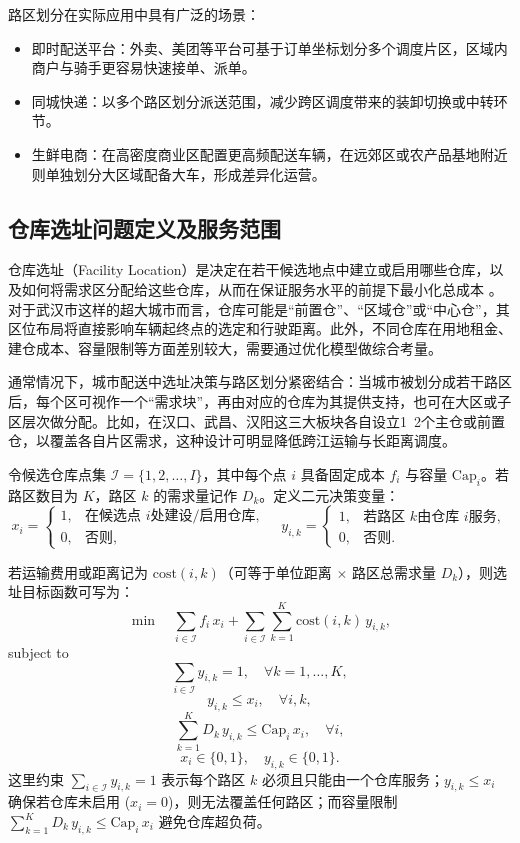 \documentclass[12pt,a4paper,twoside]{ctexbook}
\begin{document}
路区划分在实际应用中具有广泛的场景：

\begin{itemize}
\item 即时配送平台：外卖、美团等平台可基于订单坐标划分多个调度片区，区域内商户与骑手更容易快速接单、派单。

\item 同城快递：以多个路区划分派送范围，减少跨区调度带来的装卸切换或中转环节。

\item 生鲜电商：在高密度商业区配置更高频配送车辆，在远郊区或农产品基地附近则单独划分大区域配备大车，形成差异化运营。
\end{itemize}

\subsection{仓库选址问题定义及服务范围}

仓库选址（Facility Location）是决定在若干候选地点中建立或启用哪些仓库，以及如何将需求区分配给这些仓库，从而在保证服务水平的前提下最小化总成本 \cite{Daskin2013}。对于武汉市这样的超大城市而言，仓库可能是“前置仓”、“区域仓”或“中心仓”，其区位布局将直接影响车辆起终点的选定和行驶距离。此外，不同仓库在用地租金、建仓成本、容量限制等方面差别较大，需要通过优化模型做综合考量。

通常情况下，城市配送中选址决策与路区划分紧密结合：当城市被划分成若干路区后，每个区可视作一个“需求块”，再由对应的仓库为其提供支持，也可在大区或子区层次做分配。比如，在汉口、武昌、汉阳这三大板块各自设立1~2个主仓或前置仓，以覆盖各自片区需求，这种设计可明显降低跨江运输与长距离调度。

令候选仓库点集 $\mathcal{I} = \{1, 2, \dots, I\}$，其中每个点 $i$ 具备固定成本 $f_i$ 与容量 $\text{Cap}_i$。若路区数目为 $K$，路区 $k$ 的需求量记作 $D_k$。定义二元决策变量：
\[
x_i = 
\begin{cases} 
1, & \text{在候选点 $i$处建设/启用仓库}, \\
0, & \text{否则},
\end{cases} \quad
y_{i,k} = 
\begin{cases} 
1, & \text{若路区 $k$由仓库 $i$服务}, \\
0, & \text{否则}.
\end{cases}
\]

若运输费用或距离记为 $\mathrm{cost}(i,k)$（可等于单位距离 $\times$ 路区总需求量 $D_k$），则选址目标函数可写为：
\[
\min \quad \sum_{i \in \mathcal{I}} f_i \, x_i + \sum_{i \in \mathcal{I}}\sum_{k=1}^{K} \mathrm{cost}(i,k) \, y_{i,k},
\]
subject to
\[
\sum_{i \in \mathcal{I}} y_{i,k} = 1, \quad \forall k = 1,\dots,K,
\]
\[
y_{i,k} \le x_i, \quad \forall i, k,
\]
\[
\sum_{k=1}^K D_k \, y_{i,k} \le \mathrm{Cap}_i \, x_i, \quad \forall i,
\]
\[
x_i \in \{0,1\}, \quad y_{i,k} \in \{0,1\}.
\]
这里约束 $\sum_{i \in \mathcal{I}} y_{i,k} = 1$ 表示每个路区 $k$ 必须且只能由一个仓库服务；$y_{i,k} \le x_i$ 确保若仓库未启用 ($x_i=0$)，则无法覆盖任何路区；而容量限制 $\sum_{k=1}^K D_k \, y_{i,k} \le \mathrm{Cap}_i \, x_i$ 避免仓库超负荷。
\end{document}

